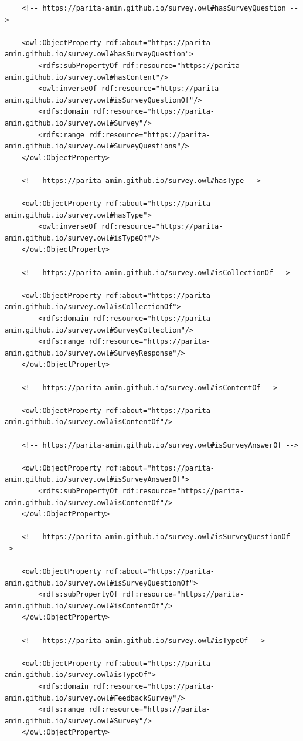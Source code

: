 \begin{lstlisting}
    <!-- https://parita-amin.github.io/survey.owl#hasSurveyQuestion -->

    <owl:ObjectProperty rdf:about="https://parita-amin.github.io/survey.owl#hasSurveyQuestion">
        <rdfs:subPropertyOf rdf:resource="https://parita-amin.github.io/survey.owl#hasContent"/>
        <owl:inverseOf rdf:resource="https://parita-amin.github.io/survey.owl#isSurveyQuestionOf"/>
        <rdfs:domain rdf:resource="https://parita-amin.github.io/survey.owl#Survey"/>
        <rdfs:range rdf:resource="https://parita-amin.github.io/survey.owl#SurveyQuestions"/>
    </owl:ObjectProperty>
    
    <!-- https://parita-amin.github.io/survey.owl#hasType -->

    <owl:ObjectProperty rdf:about="https://parita-amin.github.io/survey.owl#hasType">
        <owl:inverseOf rdf:resource="https://parita-amin.github.io/survey.owl#isTypeOf"/>
    </owl:ObjectProperty>
    
    <!-- https://parita-amin.github.io/survey.owl#isCollectionOf -->

    <owl:ObjectProperty rdf:about="https://parita-amin.github.io/survey.owl#isCollectionOf">
        <rdfs:domain rdf:resource="https://parita-amin.github.io/survey.owl#SurveyCollection"/>
        <rdfs:range rdf:resource="https://parita-amin.github.io/survey.owl#SurveyResponse"/>
    </owl:ObjectProperty>
    
    <!-- https://parita-amin.github.io/survey.owl#isContentOf -->

    <owl:ObjectProperty rdf:about="https://parita-amin.github.io/survey.owl#isContentOf"/>
    
    <!-- https://parita-amin.github.io/survey.owl#isSurveyAnswerOf -->

    <owl:ObjectProperty rdf:about="https://parita-amin.github.io/survey.owl#isSurveyAnswerOf">
        <rdfs:subPropertyOf rdf:resource="https://parita-amin.github.io/survey.owl#isContentOf"/>
    </owl:ObjectProperty>
    
    <!-- https://parita-amin.github.io/survey.owl#isSurveyQuestionOf -->

    <owl:ObjectProperty rdf:about="https://parita-amin.github.io/survey.owl#isSurveyQuestionOf">
        <rdfs:subPropertyOf rdf:resource="https://parita-amin.github.io/survey.owl#isContentOf"/>
    </owl:ObjectProperty>
    
    <!-- https://parita-amin.github.io/survey.owl#isTypeOf -->

    <owl:ObjectProperty rdf:about="https://parita-amin.github.io/survey.owl#isTypeOf">
        <rdfs:domain rdf:resource="https://parita-amin.github.io/survey.owl#FeedbackSurvey"/>
        <rdfs:range rdf:resource="https://parita-amin.github.io/survey.owl#Survey"/>
    </owl:ObjectProperty>
    

\end{lstlisting}
